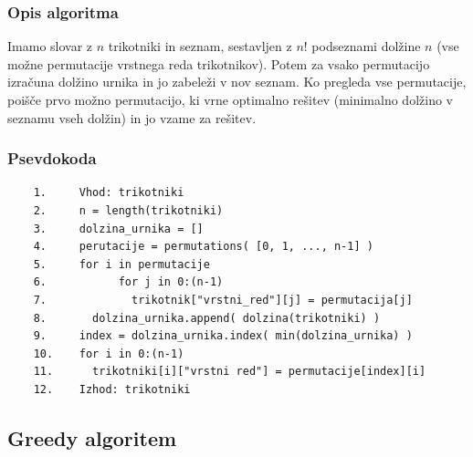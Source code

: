 \documentclass[a4paper,12pt]{article}
\theoremstyle{definition}
\theoremstyle{plain}
\begin{document}
\subsubsection{Opis algoritma}
Imamo slovar z $n$ trikotniki in seznam, sestavljen z $n!$ podseznami dolžine $n$
(vse možne permutacije vrstnega reda trikotnikov). Potem za vsako permutacijo izračuna dolžino urnika in 
jo zabeleži v nov seznam. Ko pregleda vse permutacije, poišče prvo možno permutacijo, ki vrne optimalno rešitev
(minimalno dolžino v seznamu vseh dolžin) in jo vzame za rešitev.

\subsubsection{Psevdokoda}
\begin{verbatim}
    1.     Vhod: trikotniki
    2.     n = length(trikotniki)
    3.     dolzina_urnika = []
    4.     perutacije = permutations( [0, 1, ..., n-1] )
    5.     for i in permutacije
    6.           for j in 0:(n-1)
    7.             trikotnik["vrstni_red"][j] = permutacija[j]
    8.       dolzina_urnika.append( dolzina(trikotniki) )
    9.     index = dolzina_urnika.index( min(dolzina_urnika) )
    10.    for i in 0:(n-1)
    11.      trikotniki[i]["vrstni red"] = permutacije[index][i]
    12.    Izhod: trikotniki

\end{verbatim}




\subsection{Greedy algoritem}
\end{document}
